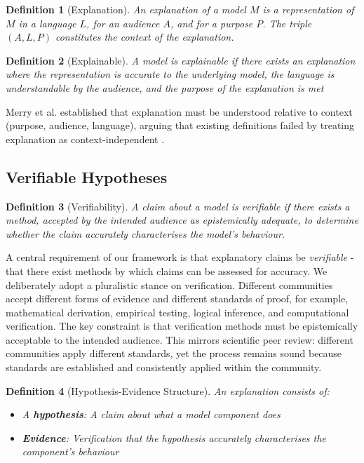 \documentclass{article}
\newtheorem{definition}{Definition}
\begin{document}
\begin{definition}[Explanation]
\label{def:explanation}
An explanation of a model $M$ is a representation of $M$ in a language $L$, for an audience $A$, and for a purpose $P$. The triple $(A, L, P)$ constitutes the \emph{context} of the explanation.
\end{definition}

\begin{definition}[Explainable]
\label{def:explainable}
A model is explainable if there exists an explanation where the representation is accurate to the underlying model, the language is understandable by the audience, and the purpose of the explanation is met
\end{definition}

Merry et al. established that explanation must be understood relative to context (purpose, audience, language), arguing that existing definitions failed by treating explanation as context-independent \cite{merry2021mental}.


\subsection{Verifiable Hypotheses}


\begin{definition}[Verifiability]
\label{def:verifiability}
A claim about a model is verifiable if there exists a method, accepted by the intended audience as epistemically adequate, to determine whether the claim accurately characterises the model's behaviour.
\end{definition}

A central requirement of our framework is that explanatory claims be \emph{verifiable} - that there exist methods by which claims can be assessed for accuracy. We deliberately adopt a pluralistic stance on verification. Different  communities accept different forms of evidence and different standards of proof, for example, mathematical derivation, empirical testing, logical inference, and computational verification. The key constraint is that verification methods must be epistemically acceptable to the intended audience. This mirrors scientific peer review: different communities apply different standards, yet the process remains sound because standards are established and consistently applied within the community.

\begin{definition}[Hypothesis-Evidence Structure]
\label{def:hypothesis-evidence}
An explanation consists of:
\begin{itemize}
    \item A \textbf{hypothesis}: A claim about what a model component does
    \item \textbf{Evidence}: Verification that the hypothesis accurately characterises the component's behaviour
\end{itemize}
\end{definition}
\end{document}
